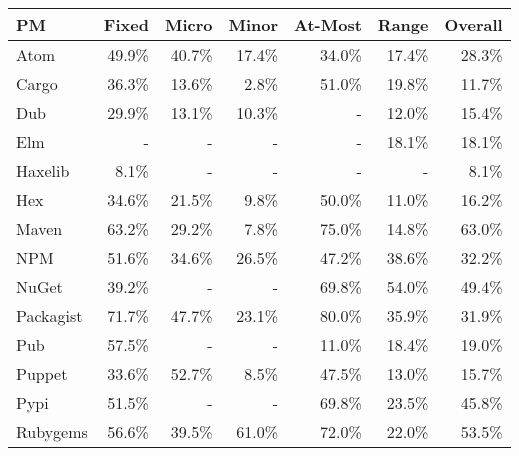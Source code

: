 \begin{tabular}{|l|rrrrr|r|}
\hline
PM & Fixed & Micro & Minor & At-Most & Range & Overall \\
\hline
Atom & 49.9\% & 40.7\% & 17.4\% & 34.0\% & 17.4\% & 28.3\% \\
Cargo & 36.3\% & 13.6\% & 2.8\% & 51.0\% & 19.8\% & 11.7\% \\
Dub & 29.9\% & 13.1\% & 10.3\% & - & 12.0\% & 15.4\% \\
Elm & - & - & - & - & 18.1\% & 18.1\% \\
Haxelib & 8.1\% & - & - & - & - & 8.1\% \\
Hex & 34.6\% & 21.5\% & 9.8\% & 50.0\% & 11.0\% & 16.2\% \\
Maven & 63.2\% & 29.2\% & 7.8\% & 75.0\% & 14.8\% & 63.0\% \\
NPM & 51.6\% & 34.6\% & 26.5\% & 47.2\% & 38.6\% & 32.2\% \\
NuGet & 39.2\% & - & - & 69.8\% & 54.0\% & 49.4\% \\
Packagist & 71.7\% & 47.7\% & 23.1\% & 80.0\% & 35.9\% & 31.9\% \\
Pub & 57.5\% & - & - & 11.0\% & 18.4\% & 19.0\% \\
Puppet & 33.6\% & 52.7\% & 8.5\% & 47.5\% & 13.0\% & 15.7\% \\
Pypi & 51.5\% & - & - & 69.8\% & 23.5\% & 45.8\% \\
Rubygems & 56.6\% & 39.5\% & 61.0\% & 72.0\% & 22.0\% & 53.5\% \\
\hline
\end{tabular}
